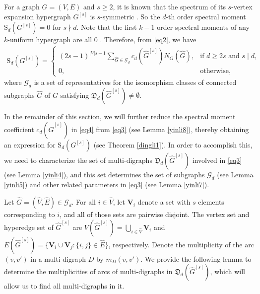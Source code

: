 \documentclass{article}
\begin{document}
For a graph $G=(V,E)$ and $s \ge 2$,
it is known that the spectrum of its $s$-vertex expansion hypergraph $G^{[s]}$ is $s$-symmetric \cite{fan2019spectral}.
So the $d$-th order spectral moment $\mathrm{S}_{d}(G^{[s]})=0$ for $s \nmid d$.
Note that the first $k-1$ order spectral moments of any $k$-uniform hypergraph are all $0$ \cite{cooper2012spectra}.
Therefore, from \eqref{eq2},
we have
\begin{align}\label{eq4}
\mathrm{S}_{d}(G^{[s]})=\begin{cases}
(2s-1)^{|V|s-1}\sum_{\widehat{G}\in\mathcal{G}_{d}}c_{d}(\widehat{G}^{[s]})N_{G}(\widehat{G}), &\text{if $d \geq 2s$ and $s \mid d$,}\\
0, &\text{otherwise,}
\end{cases}
\end{align}
where $\mathcal{G}_d$ is a set of representatives for the isomorphism classes of connected subgraphs $\widehat{G}$ of $G$ satisfying
$\mathfrak{D}_d(\widehat{G}^{[s]}) \neq \emptyset$.

In the remainder of this section,
we will further reduce the spectral moment coefficient $c_{d}(\widehat{G}^{[s]})$ in \eqref{eq4} from \eqref{eq3} (see Lemma \ref{yinli8}), thereby obtaining an expression for $\mathrm{S}_{d}(G^{[s]})$ (see Theorem \ref{dingli1}).
In order to accomplish this,
we need to characterize the set of multi-digraphs $\mathfrak{D}_{d}(\widehat{G}^{[s]})$ involved in \eqref{eq3} (see Lemma \ref{yinli4}),
and this set determines the set of subgraphs $\mathcal{G}_{d}$ (see Lemma \ref{yinli5}) and other related parameters in \eqref{eq3} (see Lemma \ref{yinli7}).

Let $\widehat{G} = (\widehat{V},\widehat{E}) \in \mathcal{G}_{d}$.
For all $i \in \widehat{V}$,
let $\mathbf{V}_{i}$ denote a set with $s$ elements corresponding to $i$,
and all of those sets are pairwise disjoint.
The vertex set and hyperedge set of $\widehat{G}^{[s]}$ are $V(\widehat{G}^{[s]})=\bigcup_{i \in \widehat{V}}\mathbf{V}_{i}$ and $E(\widehat{G}^{[s]})=\{\mathbf{V}_{i}\cup\mathbf{V}_{j}: \{i,j\} \in \widehat{E}\}$, respectively.
Denote the multiplicity of the arc $(v,v')$ in a multi-digraph $D$ by $m_{D}(v,v')$.
We provide the following lemma to determine the multiplicities of arcs of multi-digraphs in $\mathfrak{D}_{d}(\widehat{G}^{[s]})$,
which will allow us to find all multi-digraphs in it.
\end{document}
